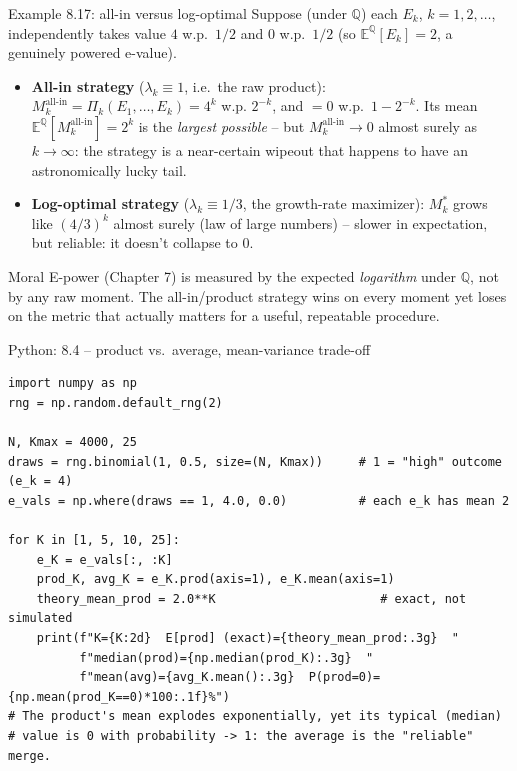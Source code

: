 \documentclass[aspectratio=169,10pt]{beamer}
\newcommand{\E}{\mathbb{E}}
\newcommand{\Qb}{\mathbb{Q}}
\begin{document}
\begin{frame}{Example 8.17: all-in versus log-optimal}
  Suppose (under $\Qb$) each $E_k$, $k=1,2,\dots$, independently takes value $4$ w.p.\ $1/2$ and $0$ w.p.\ $1/2$ (so $\E^{\Qb}[E_k]=2$, a genuinely powered e-value).
  \begin{itemize}
    \item \textbf{All-in strategy} ($\lambda_k \equiv 1$, i.e.\ the raw product): $M_k^{\text{all-in}} = \Pi_k(E_1,\dots,E_k) = 4^k$ w.p. $2^{-k}$, and $=0$ w.p.\ $1-2^{-k}$. Its mean $\E^{\Qb}[M_k^{\text{all-in}}] = 2^k$ is the \emph{largest possible} -- but $M_k^{\text{all-in}} \to 0$ almost surely as $k\to\infty$: the strategy is a near-certain wipeout that happens to have an astronomically lucky tail.
    \item \textbf{Log-optimal strategy} ($\lambda_k \equiv 1/3$, the growth-rate maximizer): $M_k^\ast$ grows like $(4/3)^k$ almost surely (law of large numbers) -- slower in expectation, but reliable: it doesn't collapse to 0.
  \end{itemize}
  \begin{block}{Moral}
    E-power (Chapter 7) is measured by the expected \emph{logarithm} under $\Qb$, not by any raw moment. The all-in/product strategy wins on every moment yet loses on the metric that actually matters for a useful, repeatable procedure.
  \end{block}
\end{frame}

\begin{frame}[fragile]{Python: 8.4 -- product vs.\ average, mean-variance trade-off}
  \begin{lstlisting}
import numpy as np
rng = np.random.default_rng(2)

N, Kmax = 4000, 25
draws = rng.binomial(1, 0.5, size=(N, Kmax))     # 1 = "high" outcome (e_k = 4)
e_vals = np.where(draws == 1, 4.0, 0.0)          # each e_k has mean 2

for K in [1, 5, 10, 25]:
    e_K = e_vals[:, :K]
    prod_K, avg_K = e_K.prod(axis=1), e_K.mean(axis=1)
    theory_mean_prod = 2.0**K                       # exact, not simulated
    print(f"K={K:2d}  E[prod] (exact)={theory_mean_prod:.3g}  "
          f"median(prod)={np.median(prod_K):.3g}  "
          f"mean(avg)={avg_K.mean():.3g}  P(prod=0)={np.mean(prod_K==0)*100:.1f}%")
# The product's mean explodes exponentially, yet its typical (median)
# value is 0 with probability -> 1: the average is the "reliable" merge.
  \end{lstlisting}
\end{frame}
\end{document}
